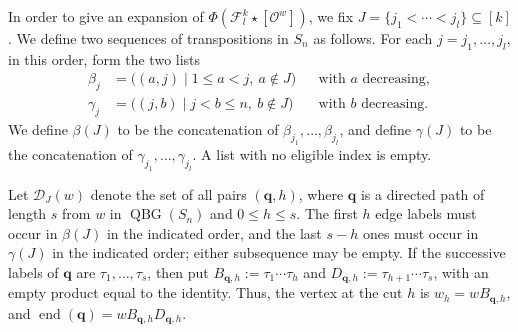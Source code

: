 \documentclass[11pt,a4paper,reqno]{amsart}
\numberwithin{equation}{section}
\theoremstyle{definition}
\DeclareMathOperator{\QBG}{QBG}
\DeclareMathOperator{\End}{end}
\newcommand{\OO}{\mathcal O}
\newcommand{\Sc}[1]{[\OO^{#1}]}
\newcommand{\qq}{\mathbf q}
\newcommand{\FF}{\mathcal F}
\begin{document}
In order to give an expansion of \(\Phi(\FF_l^k\star\Sc{w})\), we fix \(J=\{j_1<\cdots<j_l\}\subseteq[k]\).
We define two sequences of transpositions in \(S_n\) as follows.
For each \(j=j_1,\ldots,j_l\), in this order, form the two lists
\[
 \begin{aligned}
   \beta_j  &= \bigl((a,j) \mid 1\le a<j,\ a\notin J\bigr)
                &&\text{with \(a\) decreasing},\\
   \gamma_j &= \bigl((j,b) \mid j<b\le n,\ b\notin J\bigr)
                &&\text{with \(b\) decreasing}.
 \end{aligned}
\]
We define \(\beta(J)\) to be the concatenation of \(\beta_{j_1},\ldots,\beta_{j_l}\), and define 
\(\gamma(J)\) to be the concatenation of \(\gamma_{j_1},\ldots,\gamma_{j_l}\).
A list with no eligible index is empty.

Let \(\mathcal D_J(w)\) denote the set of all pairs \((\qq,h)\), where \(\qq\) is
a directed path of length \(s\) from \(w\) in \(\QBG(S_n)\) and
\(0\le h\le s\). The first \(h\) edge labels must occur in \(\beta(J)\)
in the indicated order, and the last \(s-h\) ones must occur in \(\gamma(J)\)
in the indicated order; either subsequence may be empty.
If the successive labels of \(\qq\) are \(\tau_1,\ldots,\tau_s\), then put
\(B_{\qq,h}:=\tau_1\cdots\tau_h\) and
\(D_{\qq,h}:=\tau_{h+1}\cdots\tau_s\), with an empty product equal to
the identity. Thus, the vertex at the cut \(h\) is \(w_h=wB_{\qq,h}\), and
\(\End(\qq)=wB_{\qq,h}D_{\qq,h}\).
\end{document}
